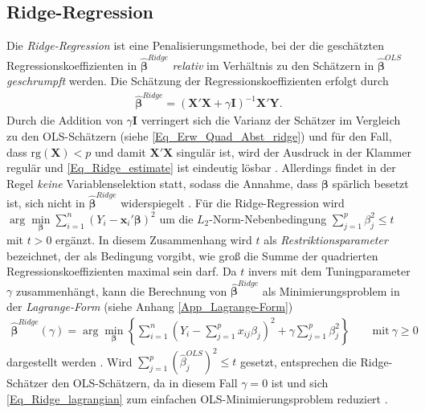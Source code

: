 \documentclass[12pt, a4paper]{report}\usepackage[]{graphicx}\usepackage[]{color}
\begin{document}
\subsection{Ridge-Regression}\label{Kap_Ridge-Regression}
Die \textit{Ridge-Regression} ist eine Penalisierungsmethode, bei der die geschätzten Regressionskoeffizienten in $\boldsymbol{\hat{\beta}}^{Ridge}$ \textit{relativ} im Verhältnis zu den Schätzern in $\boldsymbol{\hat{\beta}}^{OLS}$ \textit{geschrumpft} werden. Die Schätzung der Regressionskoeffizienten erfolgt durch
\begin{align}\label{Eq_Ridge_estimate}
\boldsymbol{\hat{\beta}}^{Ridge} = (\mathbf{X}'\mathbf{X} + \gamma \mathbf{I})^{-1}\mathbf{X}'\mathbf{Y}.
\end{align}
Durch die Addition von $\gamma \mathbf{I}$ verringert sich die Varianz der Schätzer im Vergleich zu den OLS-Schätzern (siehe \eqref{Eq_Erw_Quad_Abst_ridge}) und für den Fall, dass $\text{rg}(\mathbf{X}) < p$ und damit $\mathbf{X}'\mathbf{X}$ singulär ist, wird der Ausdruck in der Klammer regulär und \eqref{Eq_Ridge_estimate} ist eindeutig lösbar \cite{montgomery2012introduction}.
Allerdings findet in der Regel \textit{keine} Variablenselektion statt, sodass die Annahme, dass $\boldsymbol{\beta}$ spärlich besetzt ist, sich nicht in $\boldsymbol{\hat{\beta}}^{Ridge}$ widerspiegelt \cite{tibshirani96regression}. Für die Ridge-Regression wird $\arg\min\limits_{\boldsymbol{\beta}} \sum_{i=1}^{n} (Y_i - \mathbf{x}_i' \boldsymbol{\beta})^2$ um die $L_2$-Norm-Nebenbedingung $\sum_{j=1}^{p}\beta_j^2 \le t$ mit $t > 0$ ergänzt. In diesem Zusammenhang wird $t$ als \textit{Restriktionsparameter} bezeichnet, der als Bedingung vorgibt, wie groß die Summe der quadrierten Regressionskoeffizienten maximal sein darf. 
Da $t$ invers mit dem Tuningparameter $\gamma$ zusammenhängt, kann die Berechnung von $\boldsymbol{\hat{\beta}}^{Ridge}$ als Minimierungsproblem in der \textit{Lagrange-Form} (siehe Anhang \ref{App_Lagrange-Form})
\begin{align}\label{Eq_Ridge_lagrangian}
\boldsymbol{\hat{\beta}}^{Ridge}(\gamma)=\arg \displaystyle\min_{\boldsymbol{\beta}} \left\lbrace \sum_{i=1}^{n} (Y_i - \sum_{j=1}^{p} x_{ij} \beta_j )^2  + \gamma \sum_{j=1}^{p}\beta_j^2 \right\rbrace \qquad \text{mit} \ \gamma \ge 0
\end{align}
dargestellt werden \cite{hastie2009elements}.
Wird $\sum_{j=1}^{p} (\hat{\beta}_j^{OLS})^2 \le t$ gesetzt, entsprechen die Ridge-Schätzer den OLS-Schätzern, da in diesem Fall $\gamma=0$ ist und sich \eqref{Eq_Ridge_lagrangian} zum einfachen OLS-Minimierungsproblem reduziert \cite{tibshirani96regression}.\\
\end{document}
